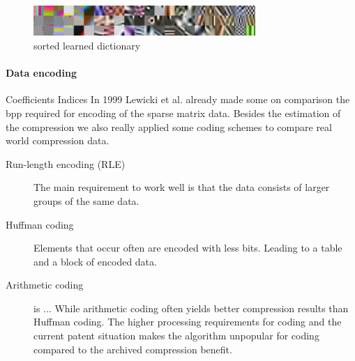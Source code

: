 




\begin{figure}[h]
\centering
\includegraphics[width = 0.75\textwidth]{images/sorted.png}
\caption{sorted learned dictionary}
\label{fig:sorted}
\end{figure}

\paragraph{Data encoding}
Coefficients
Indices
In 1999 Lewicki et al.\cite{Lewicki1999} already made some on comparison 
the bpp required for encoding of the sparse matrix data. Besides the estimation
of the compression we also really applied some coding schemes to compare real
world compression data.
\cite{Murray2006}

\begin{description}
 \item[Run-length encoding (RLE)] The main requirement to work well is
that the data consists of larger groups of the same data.
  \item[Huffman coding] Elements that occur often are encoded with less bits.
Leading to a table and a block of encoded data.
  \item[Arithmetic coding] is ...
While arithmetic coding often yields better compression results than Huffman
coding. The higher processing requirements for coding and the current patent
situation makes the algorithm unpopular for coding compared to the archived
compression benefit.
\end{description}


